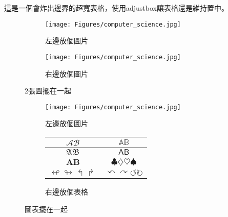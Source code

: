 \begin{table}[ht]
    \renewcommand{\arraystretch}{1}

    \caption{這是一個會炸出邊界的超寬表格，使用adjustbox讓表格還是維持置中。}
    \label{tab:tabexample5}
\end{table}

\begin{figure}[hbpt]
    \centering
    \begin{subfigure}{0.45\linewidth}
        \texttt{[image: Figures/computer\_science.jpg]}
        \caption{左邊放個圖片}
    \end{subfigure}
    \hfill
    \begin{subfigure}{0.45\linewidth}
        \texttt{[image: Figures/computer\_science.jpg]}
        \caption{右邊放個圖片}
    \end{subfigure}
    \caption{2張圖擺在一起}
    \label{fig:figexample2}
\end{figure}

\begin{figure}[hbpt]
    \centering
    \begin{subfigure}{0.4\linewidth}
        \texttt{[image: Figures/computer\_science.jpg]}
        \caption{左邊放個圖片}
    \end{subfigure}
    \hfill
    \begin{subfigure}{0.48\linewidth}
        \centering
        \begin{tabular}{c | c }
            $\mathcal{A} \mathcal{B}  $                   & $\mathbb{A} \mathbb{B}  $                                               \\
            \hline \hline
            $\mathfrak{A} \mathfrak{B}  $                 & $\mathsf{A} \mathsf{B}  $                                               \\
            $\mathbf{A} \mathbf{B}  $                     & $\clubsuit \diamondsuit \heartsuit \spadesuit  $                        \\
            $ \looparrowleft \looparrowright \Lsh \Rsh  $ & $\curvearrowleft \curvearrowright \circlearrowleft \circlearrowright  $ \\
        \end{tabular}
        \caption{右邊放個表格}
    \end{subfigure}
    \caption{圖表擺在一起}
    \label{fig:figexample3}
\end{figure}